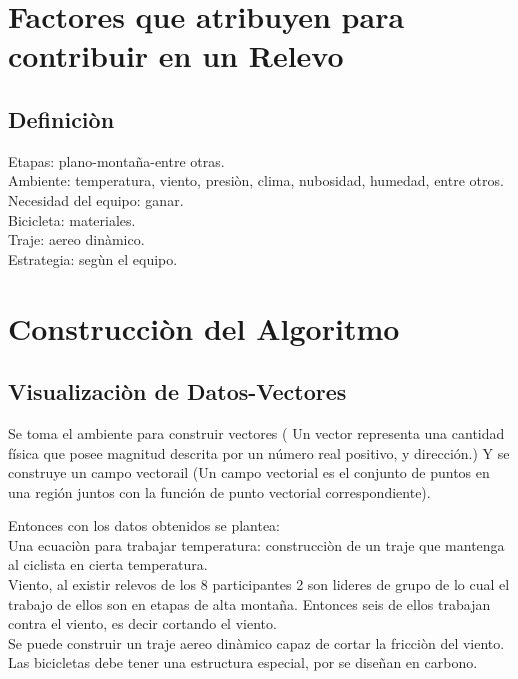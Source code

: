 \documentclass[english]{article}
\begin{document}
\section{Factores que atribuyen para contribuir en un Relevo} 

\subsection{Definiciòn} 

Etapas: plano-montaña-entre otras.\\
Ambiente: temperatura, viento, presiòn, clima, nubosidad, humedad, entre otros.\\
Necesidad del equipo: ganar.\\
Bicicleta: materiales.\\
Traje: aereo dinàmico.\\
Estrategia: segùn el equipo.\\

\section{Construcciòn del Algoritmo} 
\subsection{Visualizaciòn de Datos-Vectores}
Se toma el ambiente para construir vectores (
Un vector representa una cantidad física que posee
magnitud descrita por un número real positivo, y
dirección.) Y se construye un campo vectorail (Un campo vectorial es el conjunto de puntos en una región juntos
con la función de punto vectorial correspondiente).

Entonces con los datos obtenidos se plantea:\\
Una ecuaciòn para trabajar temperatura: construcciòn de un traje que mantenga al ciclista en cierta temperatura.\\
Viento, al existir relevos de los 8 participantes 2 son lideres de grupo de lo cual el trabajo de ellos son en etapas de alta montaña. Entonces seis de ellos trabajan contra el viento, es decir cortando el viento.\\
Se puede construir un traje aereo dinàmico capaz de cortar la fricciòn del viento.\\
Las bicicletas debe tener una estructura especial, por se diseñan en carbono.
\end{document}
